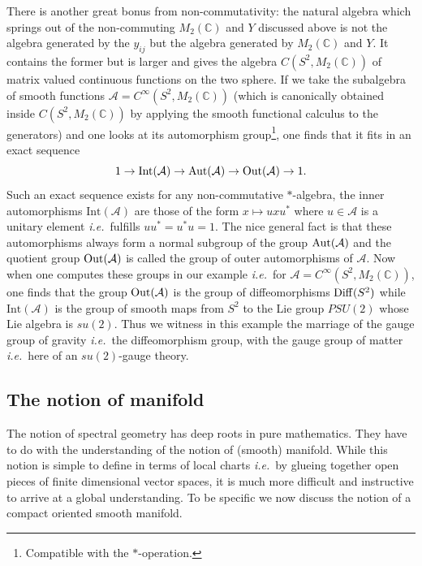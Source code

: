 \documentclass[12pt]{article}
\def\Out{{\rm Out}}
\def\Aut{{\rm Aut}}
\def\C{{\mathbb C}}
\def\cA{{\mathcal A}}
\newcommand{\ie}{{\it i.e.\/}\ }
\def\Int{{\mbox{Int}}}
\begin{document}
There is another great bonus from non-commutativity: the natural algebra which springs out of the non-commuting $M_2(\C)$ and $Y$ discussed above is not the algebra generated by the $y_{ij}$ but the algebra generated by $M_2(\C)$ and $Y$. It contains the former but is larger and gives the algebra $C(S^2,M_2(\C))$  of matrix valued continuous functions on the two sphere. If we take the subalgebra of smooth functions $\cA=C^\infty(S^2,M_2(\C))$   (which is canonically obtained inside $C(S^2,M_2(\C))$ by applying the smooth functional calculus to the generators)  and one looks at its automorphism group\footnote{Compatible with the $*$-operation.}, one finds that it fits in an exact sequence 
$$
1\to \Int(\cA)\to \Aut(\cA) \to \Out(\cA)\to 1.
$$
Such an exact sequence exists for any non-commutative $*$-algebra, the inner automorphisms $\Int(\cA)$ are those of the form $x\mapsto uxu^*$ where $u\in \cA$ is a unitary element \ie fulfills $uu^*=u^*u=1$. The nice general fact is that these automorphisms always form a normal subgroup of the group $\Aut(\cA)$ and the quotient group  $\Out(\cA)$ is called the group of outer automorphisms of $\cA$. Now when one computes these groups in our example \ie for $\cA=C^\infty(S^2,M_2(\C))$, one finds that  the group $\Out(\cA)$ is the group of diffeomorphisms ${\rm Diff}(S^2)$ while $\Int(\cA)$ is the group of smooth maps from $S^2$ to the Lie group $PSU(2)$ whose Lie algebra is $su(2)$. Thus we witness in this example the marriage of the gauge group of gravity \ie the diffeomorphism group, with the gauge group of matter \ie here of an $su(2)$-gauge theory.   
\subsection{The notion of manifold}\label{notion of manifold}\label{notionof manifold}
The notion of spectral geometry has deep roots in pure mathematics. They have to do with the  understanding of the notion of (smooth) manifold. While this notion is simple to define in terms of local charts \ie by glueing together open pieces of finite dimensional vector spaces, it is much more difficult and instructive to arrive at a global understanding. To be specific we now discuss the notion of a compact oriented smooth manifold.
\end{document}
